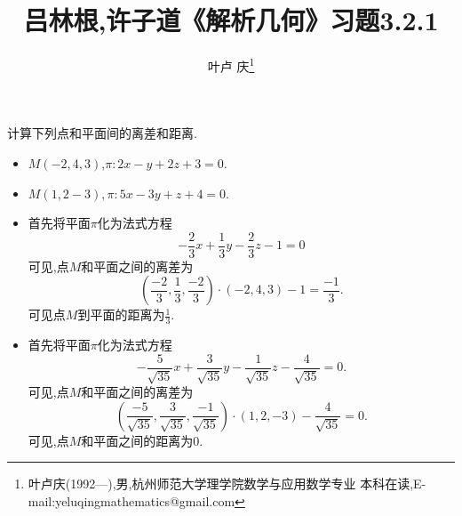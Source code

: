 \documentclass[a4paper]{article}
\begin{document}
\title{\huge{\bf{吕林根,许子道《解析几何》习题3.2.1}}} \author{\small{叶卢
    庆\footnote{叶卢庆(1992---),男,杭州师范大学理学院数学与应用数学专业
      本科在读,E-mail:yeluqingmathematics@gmail.com}}}
\maketitle
\begin{exercise}
计算下列点和平面间的离差和距离.
\begin{itemize}
\item $M(-2,4,3)$,$\pi:2x-y+2z+3=0$.
\item $M(1,2-3),\pi:5x-3y+z+4=0$.
\end{itemize}
\end{exercise}
\begin{itemize}
\item 首先将平面$\pi$化为法式方程
$$
-\frac{2}{3}x+\frac{1}{3}y-\frac{2}{3}z-1=0
$$
可见,点$M$和平面之间的离差为
$$
(\frac{-2}{3},\frac{1}{3},\frac{-2}{3})\cdot (-2,4,3)-1=\frac{-1}{3}.
$$
可见点$M$到平面的距离为$\frac{1}{3}$.
\item 首先将平面$\pi$化为法式方程
$$
-\frac{5}{\sqrt{35}}x+\frac{3}{\sqrt{35}}y-\frac{1}{\sqrt{35}}z-\frac{4}{\sqrt{35}}=0.
$$
可见,点$M$和平面之间的离差为
$$
(\frac{-5}{\sqrt{35}},\frac{3}{\sqrt{35}},\frac{-1}{\sqrt{35}})\cdot (1,2,-3)-\frac{4}{\sqrt{35}}=0.
$$
可见,点$M$和平面之间的距离为$0$.
\end{itemize}
\end{document}
